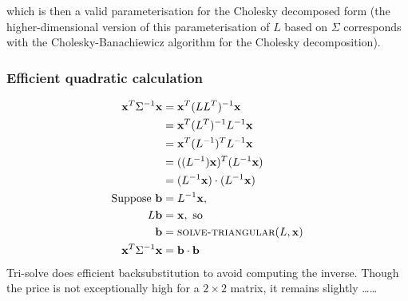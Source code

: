 \documentclass[11pt]{article} %
\def\comment#1{\color{red}#1\color{black}}
\begin{document}
which is then a valid parameterisation for the Cholesky decomposed form  (the higher-dimensional version of this parameterisation of $L$ based on $\Sigma$ corresponds with the Cholesky-Banachiewicz algorithm for the Cholesky decomposition).

\subsubsection{Efficient quadratic calculation}
\begin{align*}
	\mathbf{x}^T\Sigma^{-1}\mathbf{x}
	&= \mathbf{x}^T(LL^T)^{-1}\mathbf{x}\\
	&= \mathbf{x}^T(L^T)^{-1}L^{-1}\mathbf{x}\\
	&= \mathbf{x}^T(L^{-1})^{T}L^{-1}\mathbf{x}\\
	&= ((L^{-1})\mathbf{x})^T(L^{-1}\mathbf{x})\\
	&= (L^{-1}\mathbf{x})\cdot(L^{-1}\mathbf{x})\\
\textrm{Suppose }\mathbf{b}&=L^{-1}\mathbf{x},\\
	L\mathbf{b}&=\mathbf{x}, \textrm{ so}\\
	\mathbf{b}&= \textsc{solve-triangular}(L, \mathbf{x})\\
	\mathbf{x}^T\Sigma^{-1}\mathbf{x} &= \mathbf{b}\cdot\mathbf{b}
\end{align*}
Tri-solve does efficient backsubstitution to avoid computing the inverse. Though the price is not exceptionally high for a $2\times2$ matrix, it remains slightly  \comment{\ldots\ldots}



\end{document}
